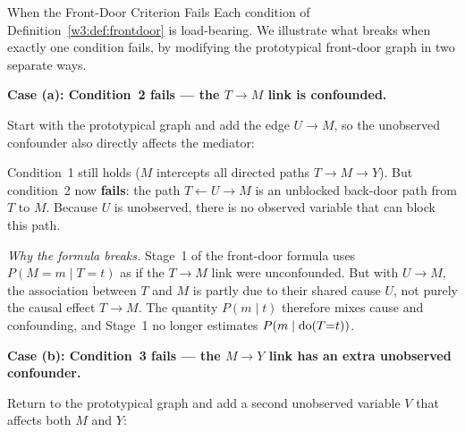 \documentclass[master.tex]{subfiles}
\begin{document}
\begin{example}{When the Front-Door Criterion Fails}
\label{w3:ex:frontdoorfail}
Each condition of Definition~\ref{w3:def:frontdoor} is load-bearing.
We illustrate what breaks when exactly one condition fails, by modifying
the prototypical front-door graph in two separate ways.

\medskip
\noindent\textbf{Case (a): Condition~2 fails --- the $T \to M$ link is confounded.}

Start with the prototypical graph and add the edge $U \to M$, so the
unobserved confounder also directly affects the mediator:

\begin{center}
\end{center}

\noindent
Condition~1 still holds ($M$ intercepts all directed paths $T \to M \to Y$).
But condition~2 now \textbf{fails}: the path $T \leftarrow U \to M$ is an
unblocked back-door path from $T$ to $M$.  Because $U$ is unobserved, there
is no observed variable that can block this path.

\textit{Why the formula breaks.}  Stage~1 of the front-door formula uses
$P(M{=}m \mid T{=}t)$ as if the $T \to M$ link were unconfounded.  But
with $U \to M$, the association between $T$ and $M$ is partly due to
their shared cause $U$, not purely the causal effect $T \to M$.
The quantity $P(m \mid t)$ therefore mixes cause and confounding, and
Stage~1 no longer estimates $P(m \mid \mathrm{do}(T{=}t))$.

\medskip
\noindent\textbf{Case (b): Condition~3 fails --- the $M \to Y$ link has
an extra unobserved confounder.}

Return to the prototypical graph and add a second unobserved variable $V$
that affects both $M$ and $Y$:

\begin{center}
\end{center}


\end{example}
\end{document}
